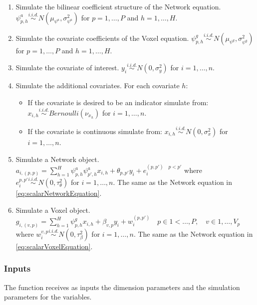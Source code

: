 \documentclass[
]{article}
\providecommand{\tightlist}{%
  \setlength{\itemsep}{0pt}\setlength{\parskip}{0pt}}
\begin{document}
\begin{enumerate}
\def\labelenumi{\arabic{enumi}.}
\setcounter{enumi}{4}
\tightlist
\item
  Simulate the bilinear coefficient structure of the Network equation.
  \(\psi^a_{p,h} \stackrel{i.i.d.}{\sim}N(\mu_{\psi^a},\sigma_{\psi^a}^2)\)
  for \(p=1,\ldots,P\) and \(h=1,\ldots,H\).
\item
  Simulate the covariate coefficients of the Voxel equation.
  \(\psi^g_{p,h} \stackrel{i.i.d.}{\sim}N(\mu_{\psi^g},\sigma_{\psi^g}^2)\)
  for \(p=1,\ldots,P\) and \(h=1,\ldots,H\).
\item
  Simulate the covariate of interest.
  \(y_i \stackrel{i.i.d.}{\sim}N(0,\sigma_y^2)\)
  for \(i=1,\ldots,n\).
\item
  Simulate the additional covariates. For each covariate \(h\):

  \begin{itemize}
  \tightlist
  \item
    If the covariate is desired to be an indicator simulate from:
    \(x_{i,h} \stackrel{i.i.d.}{\sim}Bernoulli(\nu_{x_h})\)
    for \(i=1,\ldots,n\).
  \item
    If the covariate is continuous simulate from:
    \(x_{i,h} \stackrel{i.i.d.}{\sim}N(0, \sigma^2_x)\)
    for \(i=1,\ldots,n\).
  \end{itemize}
\item
  Simulate a Network object.
  \(a_{i,(p,p)} = \sum_{h=1}^H \psi^a_{p,h}\psi^a_{p',h} x_{i,h} + \theta_{p,p'}y_i + e_i^{(p,p') \quad p < p'}\)
  where \(e_i^{p,p'} \stackrel{i.i.d.}{\sim}N(0, \tau^2_\theta)\) for \(i=1,\ldots,n\).
  The same as the Network equation in \eqref{eq:scalarNetworkEquation}.
\item
  Simulate a Voxel object.
  \(g_{i,(v,p)} = \sum_{h=1}^H \psi^g_{p,h} x_{i,h} + \beta_{v,p}y_i + w_i^{(p,p')} \quad {p\in{1<\ldots,P}, \quad v\in{1,\ldots,V_p}}\)
  where \(w_i^{v,p} \stackrel{i.i.d.}{\sim}N(0, \tau^2_\beta)\) for \(i=1,\ldots,n\).
  The same as the Network equation in \eqref{eq:scalarVoxelEquation}.
\end{enumerate}

\subsubsection{Inputs}\label{inputs-3}

The function receives as inputs the dimension parameters and the simulation
parameters for the variables.
\end{document}
